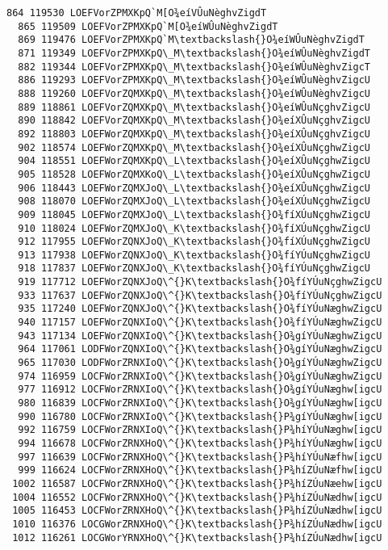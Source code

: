 \documentclass[11pt]{article}
\begin{document}
\begin{Verbatim}[commandchars=\\\{\}]
  864 119530 LOEFVorZPMXKpQ`M[O¾eíVÛuNèghvZigdT
  865 119509 LOEFVorZPMXKpQ`M[O¾eíWÛuNèghvZigdT
  869 119476 LOEFVorZPMXKpQ`M\textbackslash{}O¾eíWÛuNèghvZigdT
  871 119349 LOEFVorZPMXKpQ\_M\textbackslash{}O¾eíWÛuNèghvZigdT
  882 119344 LOEFVorZPMXKpQ\_M\textbackslash{}O¾eíWÛuNèghvZigcT
  886 119293 LOEFVorZPMXKpQ\_M\textbackslash{}O¾eíWÛuNèghvZigcU
  888 119260 LOEFVorZQMXKpQ\_M\textbackslash{}O¾eíWÛuNèghvZigcU
  889 118861 LOEFVorZQMXKpQ\_M\textbackslash{}O¾eíWÛuNçghvZigcU
  890 118842 LOEFVorZQMXKpQ\_M\textbackslash{}O¾eíXÛuNçghvZigcU
  892 118803 LOEFWorZQMXKpQ\_M\textbackslash{}O¾eíXÛuNçghvZigcU
  902 118574 LOEFWorZQMXKpQ\_M\textbackslash{}O¾eíXÛuNçghwZigcU
  904 118551 LOEFWorZQMXKpQ\_L\textbackslash{}O¾eíXÛuNçghwZigcU
  905 118528 LOEFWorZQMXKoQ\_L\textbackslash{}O¾eíXÛuNçghwZigcU
  906 118443 LOEFWorZQMXJoQ\_L\textbackslash{}O¾eíXÛuNçghwZigcU
  908 118070 LOEFWorZQMXJoQ\_L\textbackslash{}O¾eíXÚuNçghwZigcU
  909 118045 LOEFWorZQMXJoQ\_L\textbackslash{}O¾fíXÚuNçghwZigcU
  910 118024 LOEFWorZQMXJoQ\_K\textbackslash{}O¾fíXÚuNçghwZigcU
  912 117955 LOEFWorZQNXJoQ\_K\textbackslash{}O¾fíXÚuNçghwZigcU
  913 117938 LOEFWorZQNXJoQ\_K\textbackslash{}O¾fíYÚuNçghwZigcU
  918 117837 LOEFWorZQNXJoQ\_K\textbackslash{}O¾fíYÚuNçghwZigcU
  919 117712 LOEFWorZQNXJoQ\^{}K\textbackslash{}O¾fíYÚuNçghwZigcU
  933 117637 LOEFWorZQNXJoQ\^{}K\textbackslash{}O¾fíYÚuNçghwZigcU
  935 117240 LOEFWorZQNXJoQ\^{}K\textbackslash{}O¾fíYÚuNæghwZigcU
  940 117157 LOEFWorZQNXIoQ\^{}K\textbackslash{}O¾fíYÚuNæghwZigcU
  943 117134 LOEFWorZQNXIoQ\^{}K\textbackslash{}O¾gíYÚuNæghwZigcU
  964 117061 LODFWorZQNXIoQ\^{}K\textbackslash{}O¾gíYÚuNæghwZigcU
  965 117030 LODFWorZRNXIoQ\^{}K\textbackslash{}O¾gíYÚuNæghwZigcU
  974 116959 LOCFWorZRNXIoQ\^{}K\textbackslash{}O¾gíYÚuNæghwZigcU
  977 116912 LOCFWorZRNXIoQ\^{}K\textbackslash{}O¾gíYÚuNæghw[igcU
  980 116839 LOCFWorZRNXIoQ\^{}K\textbackslash{}O¾gíYÚuNæghw[igcU
  990 116780 LOCFWorZRNXIoQ\^{}K\textbackslash{}P¾gíYÚuNæghw[igcU
  992 116759 LOCFWorZRNXIoQ\^{}K\textbackslash{}P¾híYÚuNæghw[igcU
  994 116678 LOCFWorZRNXHoQ\^{}K\textbackslash{}P¾híYÚuNæghw[igcU
  997 116639 LOCFWorZRNXHoQ\^{}K\textbackslash{}P¾híYÚuNæfhw[igcU
  999 116624 LOCFWorZRNXHoQ\^{}K\textbackslash{}P¾híZÚuNæfhw[igcU
 1002 116587 LOCFWorZRNXHoQ\^{}K\textbackslash{}P¾híZÚuNæehw[igcU
 1004 116552 LOCFWorZRNXHoQ\^{}K\textbackslash{}P¾híZÚuNædhw[igcU
 1005 116453 LOCFWorZRNXHoQ\^{}K\textbackslash{}P¾híZÚuNædhw[igcU
 1010 116376 LOCGWorZRNXHoQ\^{}K\textbackslash{}P¾híZÚuNædhw[igcU
 1012 116261 LOCGWorYRNXHoQ\^{}K\textbackslash{}P¾híZÚuNædhw[igcU

\end{Verbatim}
\end{document}
